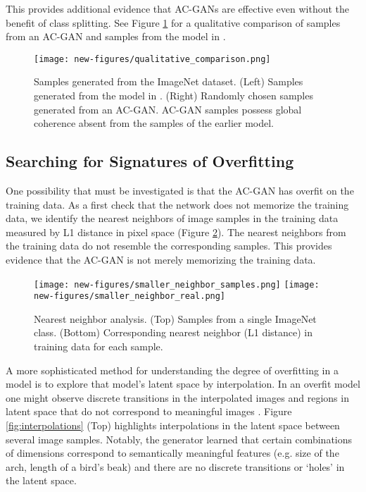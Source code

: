 \documentclass{article}
\begin{document}
This provides additional evidence that AC-GANs are effective even without
the benefit of class splitting.
See Figure \ref{fig:qualitative} for a qualitative comparison
of samples from an AC-GAN and samples from the model in \cite{IMPROVEDTECHNIQUES}.


\begin{figure}[!h]
\texttt{[image: new-figures/qualitative\_comparison.png]}
\centering
\caption{
  Samples generated from the ImageNet dataset.
  (Left) Samples generated from the model in \cite{IMPROVEDTECHNIQUES}.
  (Right) Randomly chosen samples generated from an AC-GAN.
  AC-GAN samples possess global coherence absent from the samples of the earlier model.
}
\label{fig:qualitative}
\end{figure}

\subsection{Searching for Signatures of Overfitting}
One possibility that must be investigated is that
the AC-GAN has overfit on the training data.
As a first check that the network does not memorize the
training data, we identify the nearest neighbors of image samples in
the training data measured by L1 distance in pixel space (Figure \ref{fig:neighbors}).
The nearest neighbors from the training data do not resemble the corresponding samples.
This provides evidence that the AC-GAN is not merely memorizing the training data.

\begin{figure}[!h]
\texttt{[image: new-figures/smaller\_neighbor\_samples.png]}
\texttt{[image: new-figures/smaller\_neighbor\_real.png]}
\centering
\caption{Nearest neighbor analysis. (Top) Samples from a single ImageNet class. (Bottom)
Corresponding nearest neighbor (L1 distance) in training data for each sample.}
\label{fig:neighbors}
\end{figure}

A more sophisticated method for understanding the degree of overfitting in
a model is to explore that model's latent space by interpolation.
In an overfit model one might observe discrete transitions
in the interpolated images and regions in
latent space that do not correspond to meaningful images \citep{INTERPOLATIONS, DCGAN, nvp}.
Figure \ref{fig:interpolations} (Top) highlights interpolations in the latent space between several image samples.
Notably, the generator learned that certain combinations of dimensions
correspond to semantically meaningful features (e.g. size of the arch, length of a
bird's beak) and there are no discrete transitions or `holes' in the
latent space.
\end{document}
